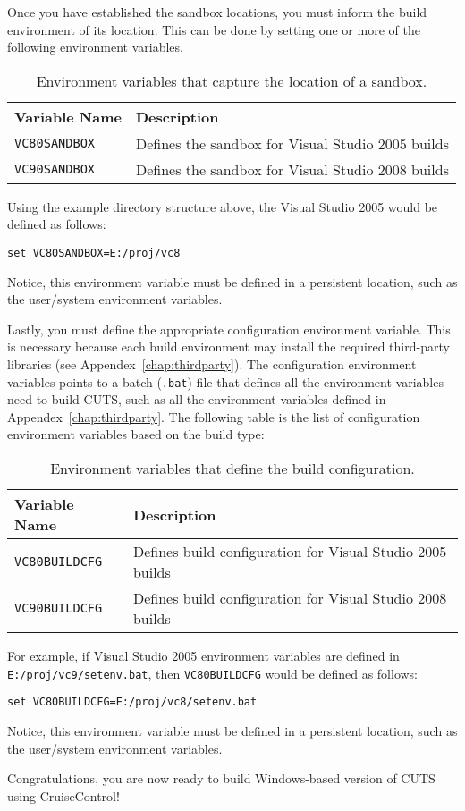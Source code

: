 Once you have established the sandbox locations, you must 
inform the build environment of its location. This can be
done by setting one or more of the following environment
variables.
\begin{table}[hbtp]
\centering
\caption{Environment variables that capture the location of a sandbox.}
\begin{tabular}{ll}
    \hline  
    \textbf{Variable Name} & \textbf{Description} \\ 
    \hline
    \texttt{VC80SANDBOX} & Defines the sandbox for Visual Studio 2005 builds \\
    \hline
    \texttt{VC90SANDBOX} & Defines the sandbox for Visual Studio 2008 builds \\
    \hline
  \end{tabular}
\end{table}
Using the example directory structure above, the Visual 
Studio 2005 would be defined as follows:
\begin{lstlisting}
set VC80SANDBOX=E:/proj/vc8
\end{lstlisting}
Notice, this environment variable must be defined in a persistent 
location, such as the user/system environment variables.

Lastly, you must define the appropriate configuration environment
variable. This is necessary because each build environment
may install the required third-party libraries (see 
Appendex~\ref{chap:thirdparty}). The configuration environment
variables points to a batch (\texttt{.bat}) file that defines
all the environment variables need to build CUTS, such as
all the environment variables defined in Appendex~\ref{chap:thirdparty}.
The following table is the list of configuration environment
variables based on the build type:
\begin{table}[hbtp]
\centering
\caption{Environment variables that define the build configuration.}
  \begin{tabular}{ll}
    \hline  
    \textbf{Variable Name} & \textbf{Description} \\ 
    \hline
    \texttt{VC80BUILDCFG} & Defines build configuration for Visual Studio 2005 builds \\
    \hline
    \texttt{VC90BUILDCFG} & Defines build configuration for Visual Studio 2008 builds \\
    \hline
  \end{tabular}
\end{table}

For example, if Visual Studio 2005 environment variables are 
defined in \texttt{E:/proj/vc9/setenv.bat}, then \texttt{VC80BUILDCFG} 
would be defined as follows:
\begin{lstlisting}
set VC80BUILDCFG=E:/proj/vc8/setenv.bat
\end{lstlisting}
Notice, this environment variable must be defined in a persistent 
location, such as the user/system environment variables.
\vspace{.2in}

\noindent Congratulations, you are now ready to build 
Windows-based version of CUTS using CruiseControl!